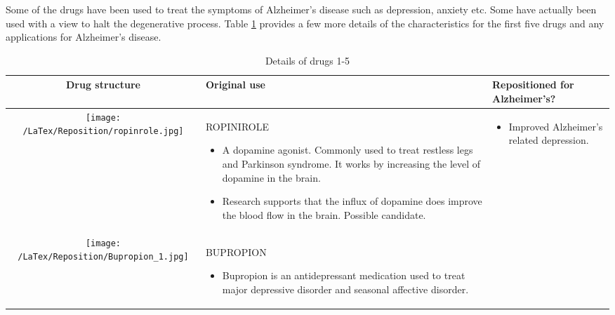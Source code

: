 \documentclass[preprint,11pt]{elsarticle}
\begin{document}
Some of the drugs have been used to treat the symptoms of Alzheimer's disease such as depression, anxiety etc. Some have actually been used with a view to halt the degenerative process. Table \ref{drugs1}  provides a few more details of the characteristics for the first five drugs and any applications for Alzheimer's disease. 


\scriptsize
\begin{table}[h!]
\scriptsize
  \centering \caption{Details of drugs 1-5 }\label{drugs1}
  \begin{tabular}{ | c | m{4.5cm} | m{4.5cm} | }
    \hline
    Drug structure & Original use & Repositioned for Alzheimer's? \\ \hline
    \begin{minipage}{.3\textwidth}
      \texttt{[image: /LaTex/Reposition/ropinrole.jpg]}
    \end{minipage}
    & ROPINIROLE
      \begin{itemize}
         \item A dopamine agonist. Commonly used to treat restless legs and Parkinson syndrome. It works by increasing the level of dopamine in the brain.
        \item Research  supports that the influx of dopamine does improve the blood flow in the brain. Possible candidate.
      \end{itemize}
    & 
      \begin{itemize}
        \item Improved Alzheimer’s related depression.
      \end{itemize}
    \\ \hline
     \begin{minipage}{.3\textwidth}
      \texttt{[image: /LaTex/Reposition/Bupropion\_1.jpg]}
    \end{minipage}
    & BUPROPION
      \begin{itemize}
        \item Bupropion is an antidepressant medication used to treat major depressive disorder and seasonal affective disorder.
         

\end{itemize}
\end{tabular}
\end{table}
\end{document}
